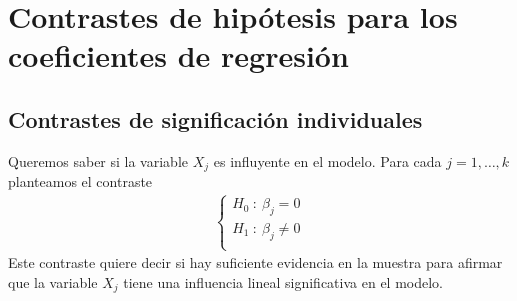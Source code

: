 \section{Contrastes de hipótesis para los coeficientes de regresión}

\subsection{Contrastes de significación individuales}
Queremos saber si la variable $X_j$ es influyente en el modelo. Para cada $j = 1,\ldots,k$ planteamos el contraste
\begin{align*}
    \left\{ \begin{array}{lcc}
                H_0 \ : \ \beta_j = 0      \\
                H_1 \ : \ \beta_j \not = 0 \\
            \end{array}
    \right.
\end{align*}
Este contraste quiere decir si hay suficiente evidencia en la muestra para afirmar que la variable $X_j$ tiene una influencia lineal significativa en el modelo.

